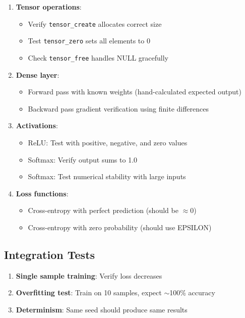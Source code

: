 \documentclass[11pt,a4paper]{article}
\begin{document}
\begin{enumerate}
    \item \textbf{Tensor operations}:
    \begin{itemize}
        \item Verify \texttt{tensor\_create} allocates correct size
        \item Test \texttt{tensor\_zero} sets all elements to 0
        \item Check \texttt{tensor\_free} handles NULL gracefully
    \end{itemize}
    
    \item \textbf{Dense layer}:
    \begin{itemize}
        \item Forward pass with known weights (hand-calculated expected output)
        \item Backward pass gradient verification using finite differences
    \end{itemize}
    
    \item \textbf{Activations}:
    \begin{itemize}
        \item ReLU: Test with positive, negative, and zero values
        \item Softmax: Verify output sums to 1.0
        \item Softmax: Test numerical stability with large inputs
    \end{itemize}
    
    \item \textbf{Loss functions}:
    \begin{itemize}
        \item Cross-entropy with perfect prediction (should be $\approx 0$)
        \item Cross-entropy with zero probability (should use EPSILON)
    \end{itemize}
\end{enumerate}

\subsection{Integration Tests}

\begin{enumerate}
    \item \textbf{Single sample training}: Verify loss decreases
    \item \textbf{Overfitting test}: Train on 10 samples, expect $\sim$100\% accuracy
    \item \textbf{Determinism}: Same seed should produce same results
\end{enumerate}
\end{document}
